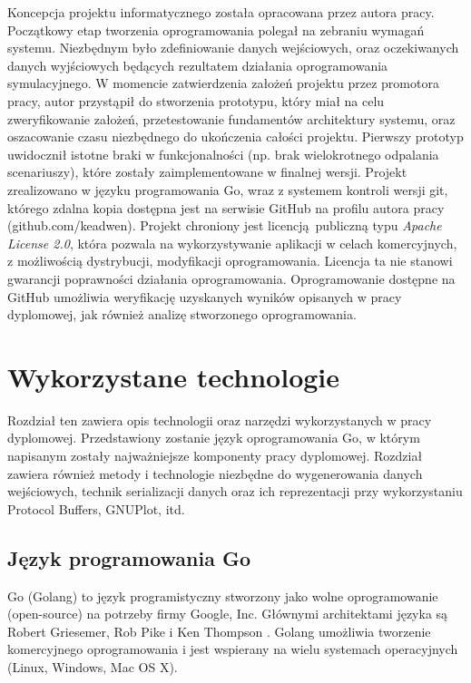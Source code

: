 \documentclass[a4paper,12pt,twoside,openany]{report}
\begin{document}
\par
Koncepcja projektu informatycznego została opracowana przez autora pracy. Początkowy etap tworzenia oprogramowania polegał na zebraniu wymagań systemu.
Niezbędnym było zdefiniowanie danych wejściowych, oraz oczekiwanych danych wyjściowych będących rezultatem działania oprogramowania symulacyjnego.
W momencie zatwierdzenia założeń projektu przez promotora pracy, autor przystąpił do stworzenia prototypu, który miał na celu zweryfikowanie założeń, przetestowanie fundamentów architektury systemu, 
oraz oszacowanie czasu niezbędnego do ukończenia całości projektu. Pierwszy prototyp uwidocznił istotne braki w funkcjonalności (np. brak wielokrotnego odpalania scenariuszy), które zostały
zaimplementowane w finalnej wersji. Projekt zrealizowano w języku programowania Go, wraz z systemem kontroli wersji git, którego zdalna kopia dostępna jest na serwisie GitHub na profilu autora pracy (github.com/keadwen).
Projekt chroniony jest licencją publiczną typu \textit{Apache License 2.0}, która pozwala na wykorzystywanie aplikacji w celach komercyjnych, z możliwością dystrybucji, modyfikacji oprogramowania.
Licencja ta nie stanowi gwarancji poprawności działania oprogramowania. Oprogramowanie dostępne na GitHub umożliwia weryfikację uzyskanych wyników opisanych w pracy dyplomowej, jak również 
analizę stworzonego oprogramowania.

\chapter{Wykorzystane technologie}

Rozdział ten zawiera opis technologii oraz narzędzi wykorzystanych w pracy dyplomowej. 
Przedstawiony zostanie język oprogramowania Go, w którym napisanym zostały najważniejsze komponenty pracy dyplomowej. Rozdział zawiera również
metody i technologie niezbędne do wygenerowania danych wejściowych, technik serializacji danych oraz ich reprezentacji przy wykorzystaniu
Protocol Buffers, GNUPlot, itd.

\section{Język programowania Go}
Go (Golang) to język programistyczny stworzony jako wolne oprogramowanie (open-source) na potrzeby firmy Google, Inc. 
Głównymi architektami języka są Robert Griesemer, Rob Pike i Ken Thompson \cite{GolangBook}.
Golang umożliwia tworzenie komercyjnego oprogramowania i jest wspierany na wielu systemach operacyjnych (Linux, Windows, Mac OS X).
\end{document}
